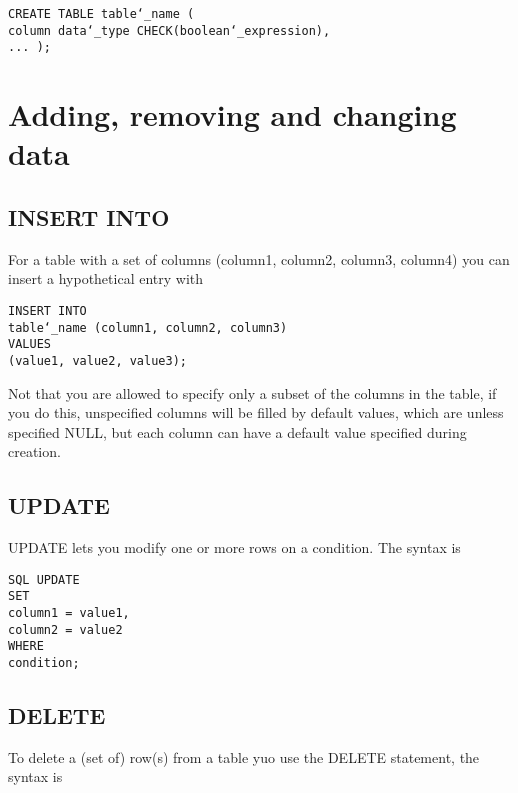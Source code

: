 \documentclass[10pt, english]{article}
\begin{document}
\texttt{CREATE TABLE table\char`_name ( \\
\hspace*{10pt} column data\char`_type CHECK(boolean\char`_expression), \\
\hspace*{10pt} ...
);
}

\section{Adding, removing and changing data}
\subsection{INSERT INTO}
For a table with a set of columns (column1, column2, column3, column4) you can insert a hypothetical entry with 

\texttt{INSERT INTO\\
\hspace*{10pt} table\char`_name (column1, column2, column3) \\
VALUES \\
\hspace*{10pt} (value1, value2, value3);
}

Not that you are allowed to specify only a subset of the columns in the table, if you do this, unspecified columns will be
filled by default values, which are unless specified NULL, but each column can have a default value specified during creation.

\subsection{UPDATE}
UPDATE lets you modify one or more rows on a condition. The syntax is 

\texttt{SQL UPDATE \\
SET \\
\hspace*{10pt} column1 = value1, \\ 
\hspace*{10pt} column2 = value2 \\
WHERE \\
\hspace*{10pt} condition;
}

\subsection{DELETE}
To delete a (set of) row(s) from a table yuo use the DELETE statement, the syntax is 
\end{document}
